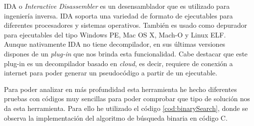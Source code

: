 
IDA o \textit{Interactive Disassembler} es un desensamblador que es utilizado para
ingeniería inversa. IDA soporta una variedad de formato de ejecutables para diferentes
procesadores y sistemas operativos. También es usado como depurador para ejecutables
del tipo Windows PE, Mac OS X, Mach-O y Linux ELF\cite{IDAPro_Wikipedia}. Aunque
nativamente IDA no tiene decompilador, en sus últimas versiones dispones de un \textit{plug-in}
que nos brinda esta funcionalidad. Cabe destacar que este plug-in es un decompilador
basado en \textit{cloud}, es decir, requiere de conexión a internet para poder generar
un pseudocódigo a partir de un ejecutable.

Para poder analizar en más profundidad esta herramienta he hecho diferentes pruebas
con códigos muy sencillas para poder comprobar que tipo de solución nos da esta
herramienta. Para ello he utilizado el código \ref{cod:binarySearch}, donde se observa
la implementación del algoritmo de búsqueda binaria en código C.

